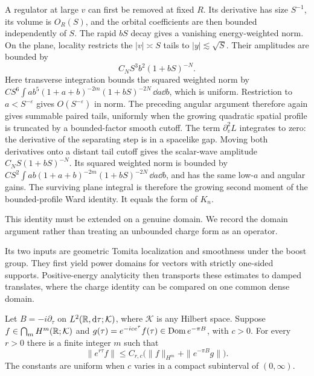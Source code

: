 A regulator at large $v$ can first be removed at fixed $R$.
Its derivative has size $S^{-1}$, its volume is $O_R(S)$, and the
orbital coefficients are then bounded independently of $S$.
The rapid $bS$ decay gives a vanishing energy-weighted norm.
On the plane, locality restricts the $|v|\asymp S$ tails to
$|y|\lesssim\sqrt S$. Their amplitudes are bounded by
\begin{equation}\label{C:plane-amplitude}
 C_NS^3b^2(1+bS)^{-N}.
\end{equation}
Here transverse integration bounds the squared weighted norm by
$CS^6\int a b^5(1+a+b)^{-2m}(1+bS)^{-2N}\,\dd a\dd b$,
which is uniform. Restriction to $a<S^{-\varepsilon}$ gives
$O(S^{-\varepsilon})$ in norm. The preceding angular argument
therefore again gives summable
paired tails, uniformly when the growing quadratic spatial
profile is truncated by a bounded-factor smooth cutoff.
The term $\partial_v^2L$ integrates to zero: the derivative of
the separating step is in a spacelike gap. Moving both derivatives
onto a distant tail cutoff gives the scalar-wave amplitude
$C_NS(1+bS)^{-N}$. Its squared weighted norm is bounded by
$CS^2\int ab(1+a+b)^{-2m}(1+bS)^{-2N}\,\dd a\dd b$,
and has the same low-$a$ and angular gains. The surviving plane integral is
therefore the growing second moment of the bounded-profile Ward
identity. It equals the form of $K_n$.

This identity must be extended on a genuine domain. We record the
domain argument rather than treating an unbounded charge form as
an operator.

Its two inputs are geometric Tomita localization and smoothness under
the boost group.  They first yield power domains for vectors with
strictly one-sided supports.  Positive-energy analyticity then
transports these estimates to damped translates, where the charge
identity can be compared on one common dense domain.

\begin{lemma}\label{C:affine-Hardy}
Let $B=-i\partial_\tau$ on $L^2(\mathbb R,\mathrm d\tau;\mathcal K)$, where
$\mathcal K$ is any Hilbert space. Suppose
$f\in\bigcap_m H^m(\mathbb R;\mathcal K)$ and
$g(\tau)=e^{-ice^\tau}f(\tau)\in\operatorname{Dom} e^{-\pi B}$, with $c>0$.
For every $r>0$ there is a finite integer $m$ such that
\begin{equation}\label{C:Hardy-power-bound}
 \|e^{r\tau}f\|\le C_{r,c}
 \bigl(\|f\|_{H^m}+\|e^{-\pi B}g\|\bigr).
\end{equation}
The constants are uniform when $c$ varies in a compact subinterval
of $(0,\infty)$.
\end{lemma}

